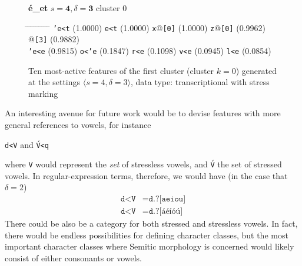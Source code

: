 \begin{figure}[t] 
\begin{mdframed}
{\LARGE\textbf{\'{e}\_et}} \large{\hfill $s=\textbf{4},\delta=\textbf{3}$} \hfill cluster 0
\vspace{3pt}
\begin{tabbing}
\hspace{6ex} \= \hspace{10ex} \= \hspace{6ex} \= \hspace{10ex} \= \hspace{6ex} \= \hspace{10ex} \= \hspace{6ex} \= \hspace{10ex} \= \hspace{6ex} \= \hspace{10ex} \kill
\texttt{\a'{e}<t} \> (1.0000) \> \texttt{e<t} \> (1.0000) \> \texttt{x}@\texttt{[0]} \> (1.0000) \> \texttt{z}@\texttt{[0]} \> (0.9962) \> \texttt{}@\texttt{[3]} \> (0.9882) \\
 \texttt{\a'{e}<e} \> (0.9815) \> \texttt{o<\a'{e}} \> (0.1847) \> \texttt{r<e} \> (0.1098) \> \texttt{v<e} \> (0.0945) \> \texttt{l<e} \> (0.0854)
\end{tabbing}
\caption{Ten most-active features of the first cluster (cluster $k = 0$) generated at the settings $\langle{s}=4,\delta=3\rangle$, data type: transcriptional with stress marking}
\label{fig:cluster-0-4-3-TS}
\end{mdframed}
\end{figure}


An interesting avenue for future work would be to devise features with more general references to vowels, for instance 
\begin{center}\texttt{d<V} and \texttt{\'{V}<q}\end{center}
 where 
 \texttt{V} would represent the \emph{set} of stressless vowels, and \texttt{\'{V}} the set of stressed vowels. In regular-expression terms, therefore, we would have (in the case that $\delta = 2$)
 \begin{align}
 \texttt{d<V} &= \texttt{d.?[aeiou]} \\
  \texttt{d<\'{V}} &= \texttt{d.?[\'{a}\'{e}\'{i}\'{o}\'{u}]}
 \end{align}
 There could be also be a category for both stressed and stressless vowels. In fact, there would be endless possibilities for defining character classes, but the most important character classes where Semitic morphology is concerned would likely consist of either consonants or vowels. 
 
